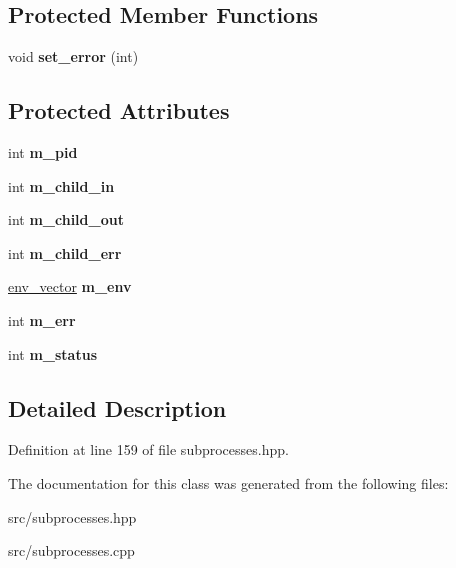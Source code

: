 \subsection*{Protected Member Functions}
\begin{DoxyCompactItemize}
\item 
void {\bfseries set\+\_\+error} (int)\hypertarget{classstlplus_1_1subprocess_afda71f164a0ca8573dbfa05340393747}{}\label{classstlplus_1_1subprocess_afda71f164a0ca8573dbfa05340393747}

\end{DoxyCompactItemize}
\subsection*{Protected Attributes}
\begin{DoxyCompactItemize}
\item 
int {\bfseries m\+\_\+pid}\hypertarget{classstlplus_1_1subprocess_a10d2b41604678d2f3ec893ca016b31b4}{}\label{classstlplus_1_1subprocess_a10d2b41604678d2f3ec893ca016b31b4}

\item 
int {\bfseries m\+\_\+child\+\_\+in}\hypertarget{classstlplus_1_1subprocess_ace46c65b0ce5b00528f089126aa64410}{}\label{classstlplus_1_1subprocess_ace46c65b0ce5b00528f089126aa64410}

\item 
int {\bfseries m\+\_\+child\+\_\+out}\hypertarget{classstlplus_1_1subprocess_a95ff443b9310a225097b7bc22d8b1dca}{}\label{classstlplus_1_1subprocess_a95ff443b9310a225097b7bc22d8b1dca}

\item 
int {\bfseries m\+\_\+child\+\_\+err}\hypertarget{classstlplus_1_1subprocess_a8b39d22068c563829a61f601bec44350}{}\label{classstlplus_1_1subprocess_a8b39d22068c563829a61f601bec44350}

\item 
\hyperlink{classstlplus_1_1env__vector}{env\+\_\+vector} {\bfseries m\+\_\+env}\hypertarget{classstlplus_1_1subprocess_a5500afc271bb12b766d59e95e5b098b6}{}\label{classstlplus_1_1subprocess_a5500afc271bb12b766d59e95e5b098b6}

\item 
int {\bfseries m\+\_\+err}\hypertarget{classstlplus_1_1subprocess_a9cede6b2bf50300b3f64f7e73d80a837}{}\label{classstlplus_1_1subprocess_a9cede6b2bf50300b3f64f7e73d80a837}

\item 
int {\bfseries m\+\_\+status}\hypertarget{classstlplus_1_1subprocess_a6c992122096061a81fc4acfb028e326b}{}\label{classstlplus_1_1subprocess_a6c992122096061a81fc4acfb028e326b}

\end{DoxyCompactItemize}


\subsection{Detailed Description}


Definition at line 159 of file subprocesses.\+hpp.



The documentation for this class was generated from the following files\+:\begin{DoxyCompactItemize}
\item 
src/subprocesses.\+hpp\item 
src/subprocesses.\+cpp\end{DoxyCompactItemize}
